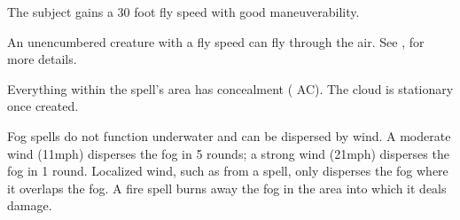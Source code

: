 \spellrng{\rngtouch}
\spelldur{\durshort}
\begin{spelleffect}
    The subject gains a 30 foot fly speed with good maneuverability.
\end{spelleffect}
\begin{spellnotes}
    An unencumbered creature with a fly speed can fly through the air. See , for more details.
\end{spellnotes}

\spellrng{\rngmed}
\spelldur{\durshort}
\begin{spelleffect}
  Everything within the spell's area has concealment ( AC). The cloud is stationary once created.
\end{spelleffect}
\begin{spellnotes}
    Fog spells do not function underwater and can be dispersed by wind. A moderate wind (11\add mph) disperses the fog in 5 rounds; a strong wind (21\add mph) disperses the fog in 1 round. Localized wind, such as from a  spell, only disperses the fog where it overlaps the fog. A fire spell burns away the fog in the area into which it deals damage.
\end{spellnotes}

